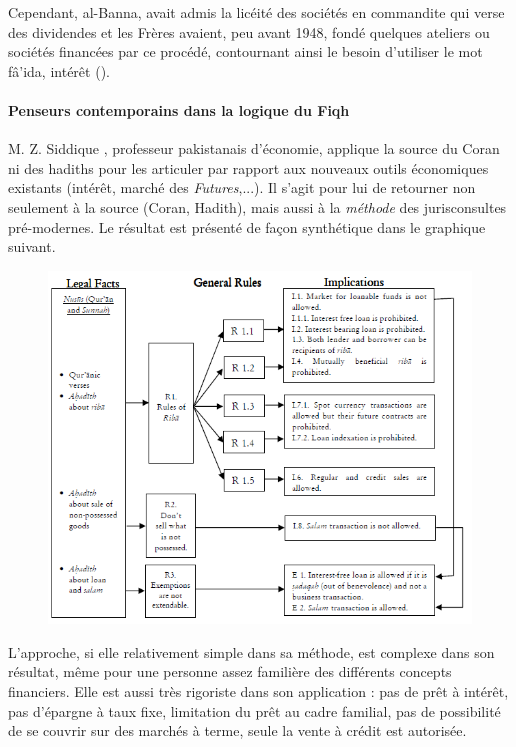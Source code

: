 Cependant, al-Banna, avait admis la licéité des sociétés en commandite qui verse des dividendes et les Frères avaient, peu avant 1948, fondé quelques ateliers
ou sociétés financées par ce procédé, contournant ainsi le besoin d'utiliser le mot fâ'ida, intérêt (\cite{Jomier:AdbouCaisseEpargne}).


\paragraph{Penseurs contemporains dans la logique du Fiqh}  M. Z.  Siddique
, professeur pakistanais d'économie, applique la source du Coran ni des hadiths pour les articuler par rapport aux nouveaux outils économiques existants (intérêt, marché des \textit{Futures},...). Il s'agit pour lui de retourner non seulement à la source (Coran, Hadith), mais aussi à la \textit{méthode} des jurisconsultes pré-modernes.
Le résultat est présenté de façon synthétique dans le graphique suivant.

\begin{figure}[h!]
    \centering  

    \includegraphics{CourantsIslamContemporain/ImagesCourantsIslamContemporain/Ribadistinction.png}

\end{figure}
L'approche, si elle relativement simple dans sa méthode, est complexe dans son résultat, même pour une personne assez familière des différents concepts financiers. Elle est aussi très rigoriste dans son application : pas de prêt à intérêt, pas d'épargne à taux fixe, limitation du prêt au cadre familial, pas de possibilité de se couvrir sur des marchés à terme,  seule la vente à crédit est autorisée.
 
